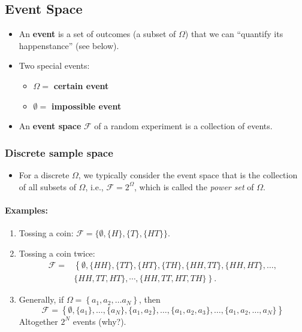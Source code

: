 \subsection{Event Space}
\begin{itemize}
\item An \textbf{event} is a set of outcomes (a subset of \(\Omega\))
   that we can ``quantify its happenstance'' (see below). 
\item Two special events: 
\begin{itemize}
\item \(\Omega =\)  \textbf{certain event} 
\item \(\emptyset =\) \textbf{impossible event}
\end{itemize}
\item An \textbf{event space} \(\mathcal{F}\) of a random experiment
is a collection of events.
\end{itemize}

\subsubsection{Discrete sample space}
\begin{itemize}
\item For a discrete \(\Omega\), we typically consider the event space
that is the collection
of all subsets of \(\Omega\), i.e., \(\mathcal{F} = 2^{\Omega}\),
which is called the \emph{power set} of \(\Omega\).
\end{itemize}

\paragraph{Examples:}
\begin{enumerate}
\item Tossing a coin: \(\mathcal{F} =\{\emptyset,\{H\},\{T\},\{H T\}\}\).
\item Tossing a coin twice:  
\begin{align*}
\mathcal{F} =& \left\{\emptyset,\{H H\},\{T T\},\{H T\},\{T H\},
 \{H H, T T\},\{H H, H T\}, \ldots, \right. \\
 & \left. \{H H, T T, H T\}, \cdots,\{H H, T T, H T, T H\} \right\}.
\end{align*}
\item Generally, if 
\( \Omega=\left\{a_{1}, a_{2}, \ldots
a_{N}\right\}\), then 
\begin{equation*}
\mathcal{F}=\left\{\emptyset,\{a_{1}\},
\ldots,\{a_{N}\}, \{a_{1}, a_{2}\},
\ldots,\{a_{1}, a_{2}, a_{3}\}, \ldots,
\{a_{1}, a_{2}, \ldots, a_{N}\}\right\}
\end{equation*}
Altogether \(2^{N}\) events (why?).
\end{enumerate}

